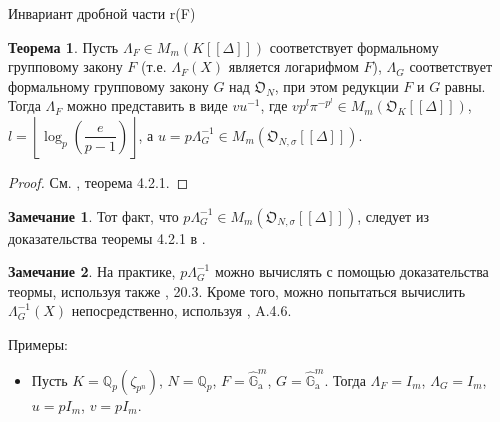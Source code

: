 \documentclass[a4paper,14pt]{extarticle}
\theoremstyle{definition}
\newtheorem{theorem}{Теорема}[section]
\newtheorem{remark}{Замечание}[section]
\newcommand{\bG}{\mathbb{G}}
\newcommand{\bQ}{\mathbb{Q}}
\newcommand{\fO}{\mathfrak{O}}
\newcommand{\GGa}{\hat{\bG}_{\mathrm{a}}}
\begin{document}
\begin{section}{Инвариант дробной части r(F)}

\begin{theorem}\label{theorem:4.0:Lambda_as_fraction}
    Пусть ${ \Lambda_F \in M_m(K[[\Delta]]) }$ соответствует формальному групповому закону $F$ (т.е. ${ \Lambda_F(X) }$ является логарифмом $F$), ${ \Lambda_G }$ соответствует формальному групповому закону $G$ над $\fO_N$, при этом редукции $F$ и $G$ равны. Тогда $\Lambda_F$ можно представить в виде ${ v u^{-1} }$, где ${ v p^l \pi^{-p^l} \in M_m(\fO_K[[\Delta]]) }$, ${ l = \left\lfloor \log_p\left( \dfrac{e}{p - 1} \right) \right\rfloor }$, а ${ u = p \Lambda_G^{-1} \in M_m(\fO_{N, \sigma}[[\Delta]]) }$.
\end{theorem}
\begin{proof}
    См. \cite{BondarkoThesis}, теорема 4.2.1.
\end{proof}

\begin{remark}\label{remark:4.after_Lambda_as_fraction:incidence}
    Тот факт, что ${ p \Lambda_G^{-1} \in M_m(\fO_{N, \sigma}[[\Delta]]) }$, следует из доказательства теоремы 4.2.1 в \cite{BondarkoThesis}.
\end{remark}

\begin{remark}\label{remark:4.after_Lambda_as_fraction:calculation}
   На практике, ${ p \Lambda_G^{-1} }$ можно вычислять с помощью доказательства теормы, используя также \cite{Hazewinkel}, 20.3. Кроме того, можно попытаться вычислить ${ \Lambda_G^{-1}(X) }$ непосредственно, используя \cite{Hazewinkel}, A.4.6.
\end{remark}

Примеры:
\begin{itemize}
    \item Пусть ${ K = \bQ_p(\zeta_{p^n}) }$, ${ N = \bQ_p }$, ${ F = \GGa^m }$, ${ G = \GGa^m }$. Тогда ${ \Lambda_F = I_m }$, ${ \Lambda_G = I_m }$, ${ u = p I_m }$, ${ v = p I_m }$.
\end{itemize}


\end{section}
\end{document}
